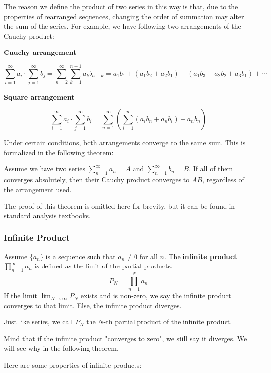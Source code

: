 The reason we define the product of two series in this way is that, due to the properties of rearranged sequences, changing the order of summation may alter the sum of the series. For example, we have following two arrangements of the Cauchy product:

\textbf{Cauchy arrangement}

\[
\sum_{i=1}^{\infty} a_i \cdot \sum_{j=1}^{\infty} b_j = \sum_{n=2}^{\infty} \sum_{k=1}^{n-1} a_k b_{n-k} = a_1 b_1 + (a_1 b_2 + a_2 b_1) + (a_1 b_3 + a_2 b_2 + a_3 b_1) + \cdots
\]

\textbf{Square arrangement}

\[
\sum_{i=1}^{\infty} a_i \cdot \sum_{j=1}^{\infty} b_j = \sum_{n=1}^{\infty} \left(\sum_{i=1}^{n}(a_i b_n+ a_n b_i) - a_n b_n \right)
\]

Under certain conditions, both arrangements converge to the same sum. This is formalized in the following theorem:

\begin{theorem}
    Assume we have two series $\sum_{n=1}^{\infty} a_n = A$ and $\sum_{n=1}^{\infty} b_n = B$. If all of them converges absolutely, then their Cauchy product converges to $AB$, regardless of the arrangement used.
\end{theorem}

The proof of this theorem is omitted here for brevity, but it can be found in standard analysis textbooks.

\subsubsection{Infinite Product}
\begin{definition}
    Assume $\{a_n\}$ is a sequence such that $a_n \neq 0$ for all $n$. The \textbf{infinite product} $\prod_{n=1}^{\infty} a_n$ is defined as the limit of the partial products:
    \[ P_N = \prod_{n=1}^{N} a_n \]
    If the limit $\lim_{N \to \infty} P_N$ exists and is non-zero, we say the infinite product converges to that limit.
    Else, the infinite product diverges.
\end{definition}

Just like series, we call $P_N$ the $N$-th partial product of the infinite product.

Mind that if the infinite product "converges to zero", we still say it diverges. We will see why in the following theorem.

Here are some properties of infinite products:

